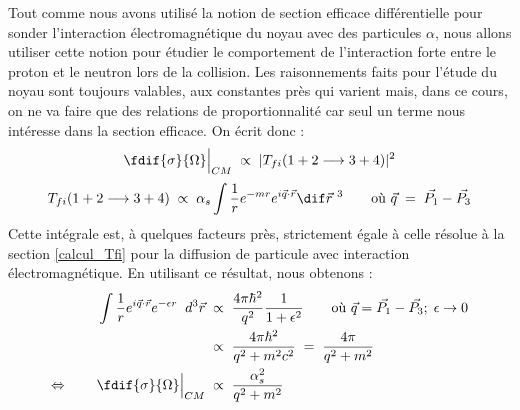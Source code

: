 Tout comme nous avons utilisé la notion de section efficace différentielle pour sonder l'interaction électromagnétique du noyau avec des particules $\alpha$, nous allons utiliser cette notion pour étudier le comportement de l'interaction forte entre le proton et le neutron lors de la collision. Les raisonnements faits pour l'étude du noyau sont toujours valables, aux constantes près qui varient mais, dans ce cours, on ne va faire que des relations de proportionnalité car seul un terme nous intéresse dans la section efficace. On écrit donc :
\begin{equation*}
    \fdif{\sigma}{\Omega}\Big|_{CM} \; \propto \; |T_{fi}(1+2\longrightarrow3+4)|^2
\end{equation*}
\begin{equation*}
    T_{fi}(1+2\longrightarrow3+4)\; \propto \; \alpha_s \int \dfrac{1}{r}e^{-mr}e^{i\Vec{q}\cdot\Vec{r}}\dif\Vec{r}^{\ 3}
    \qquad \text{où }\Vec{q} \eq \Vec{P_1} - \Vec{P_3}
\end{equation*}
Cette intégrale est, à quelques facteurs près, strictement égale à celle résolue à la section \ref{calcul_Tfi} pour la diffusion de particule avec interaction électromagnétique. En utilisant ce résultat, nous obtenons :
\begin{align*}
    \int \dfrac{1}{r}e^{i\Vec{q}\cdot\Vec{r}}e^{-\epsilon r} \;\;d^3\Vec{r}
    &\;\propto\; 
    \dfrac{4\pi\hbar^2}{q^2}\dfrac{1}{1+\epsilon^2} \qquad \text{où }\Vec{q} 
    = \Vec{P_1} - \Vec{P_3}; \; \epsilon \rightarrow 0\\
    &\;\propto\; 
    \dfrac{4\pi\hbar^2}{q^2+m^2c^2}
    \eq \dfrac{4\pi}{q^2+m^2}\\
    \Leftrightarrow \qquad 
    \fdif{\sigma}{\Omega}\Big|_{CM} 
    &\; \propto \; \dfrac{\alpha_s^2}{q^2 + m^2}
\end{align*}

